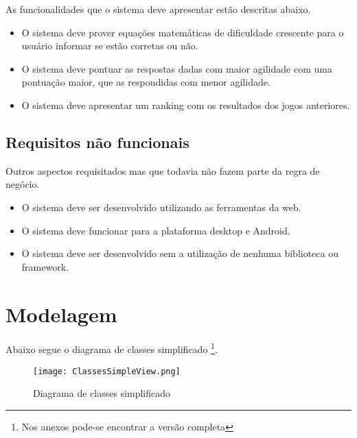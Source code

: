 As funcionalidades que o sistema deve apresentar estão descritas abaixo.

\begin{itemize}
    \item O sistema deve prover equações matemáticas de dificuldade crescente para o usuário informar se estão corretas ou não.
    \item O sistema deve pontuar as respostas dadas com maior agilidade com uma pontuação maior, que as respondidas com menor agilidade.
    \item O sistema deve apresentar um ranking com os resultados dos  jogos anteriores.
\end{itemize}

\subsection{Requisitos não funcionais}

Outros aspectos requisitados mas que todavia não fazem parte da regra de negócio.

\begin{itemize}
    \item O sistema deve ser desenvolvido utilizando as ferramentas da web.
    \item O sistema deve funcionar para a plataforma desktop e Android.
    \item O sistema deve ser desenvolvido sem a utilização de nenhuma biblioteca ou framework.
\end{itemize}

\section{Modelagem}

Abaixo segue o diagrama de classes simplificado \footnote{Nos anexos pode-se encontrar a versão completa}.

\begin{figure}
    \centering
    \texttt{[image: ClassesSimpleView.png]}
	\caption{Diagrama de classes simplificado}
\end{figure}

